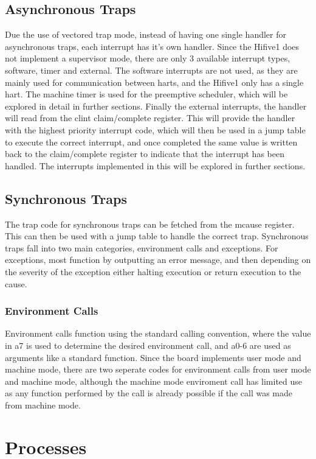 \subsection{Asynchronous Traps}
Due the use of vectored trap mode, instead of having one single handler for asynchronous traps, each interrupt has it's own handler. Since the Hifive1 does not implement a supervisor mode, there are only 3 available interrupt types, software, timer and external. The software interrupts are not used, as they are mainly used for communication between harts, and the Hifive1 only has a single hart. The machine timer is used for the preemptive scheduler, which will be explored in detail in further sections. Finally the external interrupts, the handler will read from the \ac{clint} claim/complete register. This will provide the handler with the highest priority interrupt code, which will then be used in a jump table to execute the correct interrupt, and once completed the same value is written back to the claim/complete register to indicate that the interrupt has been handled. The interrupts implemented in this will be explored in further sections.
\subsection{Synchronous Traps}
The trap code for synchronous traps can be fetched from the mcause register. This can then be used with a jump table to handle the correct trap. Synchronous traps fall into two main categories, environment calls and exceptions. For exceptions, most function by outputting an error message, and then depending on the severity of the exception either halting execution or return execution to the cause.
\subsubsection{Environment Calls}
Environment calls function using the standard calling convention, where the value in a7 is used to determine the desired environment call, and a0-6 are used as arguments like a standard function. Since the board implements user mode and machine mode, there are two seperate codes for environment calls from user mode and machine mode, although the machine mode enviroment call has limited use as any function performed by the call is already possible if the call was made from machine mode.
\section{Processes}
